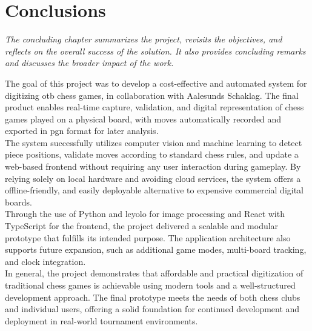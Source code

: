\chapter{Conclusions}

\begin{center}
    \textit{The concluding chapter summarizes the project, revisits the objectives, and reflects on the overall success of the solution. It also provides concluding remarks and discusses the broader impact of the work.}
\end{center}

The goal of this project was to develop a cost-effective and automated system for digitizing \gls{otb} chess games, in collaboration with Aalesunds Schaklag. The final product enables real-time capture, validation, and digital representation of chess games played on a physical board, with moves automatically recorded and exported in \gls{pgn} format for later analysis. \\

The system successfully utilizes computer vision and machine learning to detect piece positions, validate moves according to standard chess rules, and update a web-based frontend without requiring any user interaction during gameplay. By relying solely on local hardware and avoiding cloud services, the system offers a offline-friendly, and easily deployable alternative to expensive commercial digital boards. \\

Through the use of Python and \gls{leyolo} for image processing and React with TypeScript for the frontend, the project delivered a scalable and modular prototype that fulfills its intended purpose. The application architecture also supports future expansion, such as additional game modes, multi-board tracking, and clock integration. \\

In general, the project demonstrates that affordable and practical digitization of traditional chess games is achievable using modern tools and a well-structured development approach. The final prototype meets the needs of both chess clubs and individual users, offering a solid foundation for continued development and deployment in real-world tournament environments.